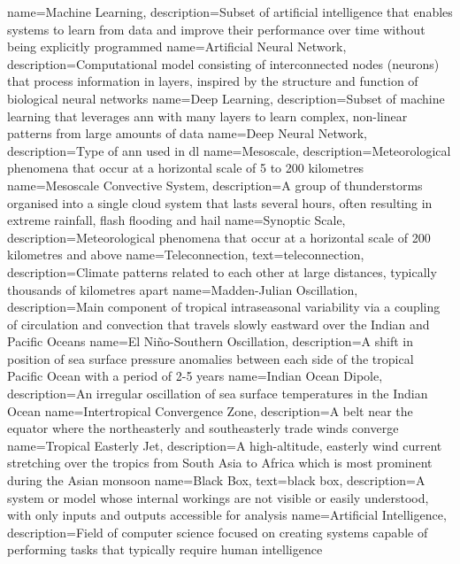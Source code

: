 {
    name=Machine Learning,
    description={Subset of artificial intelligence that enables systems to learn from data and improve their performance over time without being explicitly programmed}
}
{
    name=Artificial Neural Network,
    description={Computational model consisting of interconnected nodes (neurons) that process information in layers, inspired by the structure and function of biological neural networks}
}
{
    name=Deep Learning,
    description={Subset of machine learning that leverages \acrfull{ann} with many layers to learn complex, non-linear patterns from large amounts of data}
}
{
    name=Deep Neural Network,
    description={Type of \acrfull{ann} used in \acrfull{dl}}
}
{
    name=Mesoscale,
    description={Meteorological phenomena that occur at a horizontal scale of 5 to 200 kilometres}
}
{
    name=Mesoscale Convective System,
    description={A group of thunderstorms organised into a single cloud system that lasts several hours, often resulting in extreme rainfall, flash flooding and hail}
}
{
    name=Synoptic Scale,
    description={Meteorological phenomena that occur at a horizontal scale of 200 kilometres and above}
}
{
    name=Teleconnection,
    text={teleconnection},
    description={Climate patterns related to each other at large distances, typically thousands of kilometres apart}
}
{
    name=Madden-Julian Oscillation,
    description={Main component of tropical intraseasonal variability via a coupling of circulation and convection that travels slowly eastward over the Indian and Pacific Oceans}
}
{
    name=El Niño-Southern Oscillation,
    description={A shift in position of sea surface pressure anomalies between each side of the tropical Pacific Ocean with a period of 2-5 years}
}
{
    name=Indian Ocean Dipole,
    description={An irregular oscillation of sea surface temperatures in the Indian Ocean}
}
{
    name=Intertropical Convergence Zone,
    description={A belt near the equator where the northeasterly and southeasterly trade winds converge}
}
{
    name=Tropical Easterly Jet,
    description={A high-altitude, easterly wind current stretching over the tropics from South Asia to Africa which is most prominent during the Asian monsoon}
}
{
    name=Black Box,
    text={black box},
    description={A system or model whose internal workings are not visible or easily understood, with only inputs and outputs accessible for analysis}
}
{
    name=Artificial Intelligence,
    description={Field of computer science focused on creating systems capable of performing tasks that typically require human intelligence}
}

